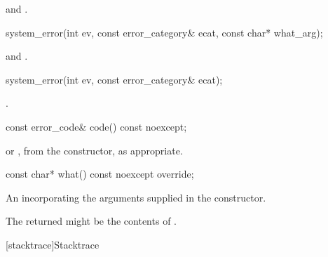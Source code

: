 \begin{itemdescr}
\pnum
\ensures
\raggedright {} and\linebreak
{}.
\end{itemdescr}

%
\begin{itemdecl}
system_error(int ev, const error_category& ecat, const char* what_arg);
\end{itemdecl}

\begin{itemdescr}
\pnum
\ensures
\raggedright {} and\linebreak
{}.
\end{itemdescr}

%
\begin{itemdecl}
system_error(int ev, const error_category& ecat);
\end{itemdecl}

\begin{itemdescr}
\pnum
\ensures
{}.
\end{itemdescr}

%
\begin{itemdecl}
const error_code& code() const noexcept;
\end{itemdecl}

\begin{itemdescr}
\pnum
\returns
{} or , from the constructor,
as appropriate.
\end{itemdescr}

%
\begin{itemdecl}
const char* what() const noexcept override;
\end{itemdecl}

\begin{itemdescr}
\pnum
\returns
An \ntbs{} incorporating the arguments supplied in the constructor.

\begin{note}
The returned \ntbs{} might be the contents of .
\end{note}
\end{itemdescr}

[stacktrace]{Stacktrace}

